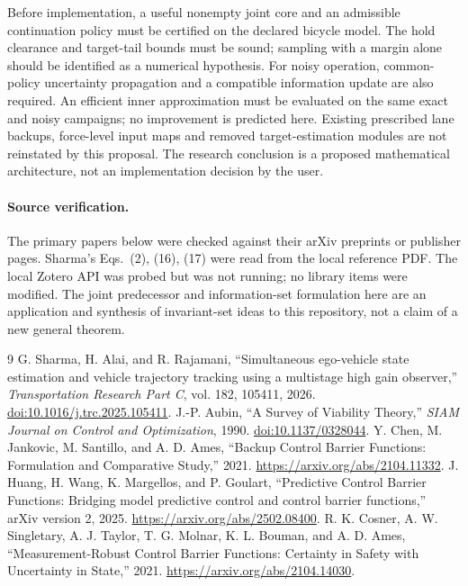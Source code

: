 \documentclass[11pt]{article}
\begin{document}
Before implementation, a useful nonempty joint core and an admissible
continuation policy must be certified on the declared bicycle model.
The hold clearance and target-tail bounds must be sound; sampling with a
margin alone should be identified as a numerical hypothesis. For noisy
operation, common-policy uncertainty propagation and a compatible
information update are also required. An efficient inner approximation
must be evaluated on the same exact and noisy campaigns; no improvement
is predicted here. Existing prescribed lane backups, force-level input
maps and removed target-estimation modules are not reinstated by this
proposal. The research conclusion is a proposed mathematical architecture,
not an implementation decision by the user.

\paragraph{Source verification.}
The primary papers below were checked against their arXiv preprints or
publisher pages. Sharma's Eqs.~(2), (16), (17) were read from the local
reference PDF. The local Zotero API was probed but was not running; no
library items were modified. The joint predecessor and information-set
formulation here are an application and synthesis of invariant-set ideas
to this repository, not a claim of a new general theorem.

\begin{thebibliography}{9}
G. Sharma, H. Alai, and R. Rajamani,
``Simultaneous ego-vehicle state estimation and vehicle trajectory tracking
using a multistage high gain observer,''
\emph{Transportation Research Part C}, vol. 182, 105411, 2026.
\href{https://doi.org/10.1016/j.trc.2025.105411}{doi:10.1016/j.trc.2025.105411}.
J.-P. Aubin, ``A Survey of Viability Theory,''
\emph{SIAM Journal on Control and Optimization}, 1990.
\href{https://doi.org/10.1137/0328044}{doi:10.1137/0328044}.
Y. Chen, M. Jankovic, M. Santillo, and A. D. Ames,
``Backup Control Barrier Functions: Formulation and Comparative Study,''
2021. \url{https://arxiv.org/abs/2104.11332}.
J. Huang, H. Wang, K. Margellos, and P. Goulart,
``Predictive Control Barrier Functions: Bridging model predictive control
and control barrier functions,'' arXiv version 2, 2025.
\url{https://arxiv.org/abs/2502.08400}.
R. K. Cosner, A. W. Singletary, A. J. Taylor, T. G. Molnar,
K. L. Bouman, and A. D. Ames,
``Measurement-Robust Control Barrier Functions: Certainty in Safety with
Uncertainty in State,'' 2021.
\url{https://arxiv.org/abs/2104.14030}.
\end{thebibliography}
\end{document}
